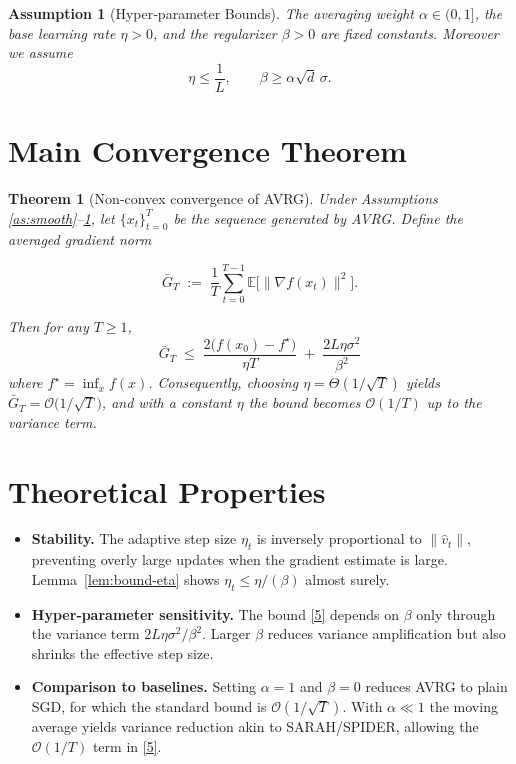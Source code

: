 \documentclass{article}
\newtheorem{theorem}{Theorem}
\newtheorem{assumption}{Assumption}
\newcommand{\E}{\mathbb{E}}
\begin{document}
\begin{assumption}[Hyper‑parameter Bounds]\label{as:params}
The averaging weight $\alpha\in(0,1]$, the base learning rate $\eta>0$,
and the regularizer $\beta>0$ are fixed constants. Moreover we assume
\[
\eta\le\frac{1}{L},\qquad \beta\ge \alpha\sqrt{d}\,\sigma .
\tag{A3}
\]
\end{assumption}

\section*{Main Convergence Theorem}
\begin{theorem}[Non‑convex convergence of AVRG]\label{thm:main}
Under Assumptions \ref{as:smooth}–\ref{as:params}, let $\{x_t\}_{t=0}^{T}$ be the
sequence generated by AVRG. Define the averaged gradient norm  

\[
\bar G_T \;:=\; \frac{1}{T}\sum_{t=0}^{T-1}\E\!\big[\|\nabla f(x_t)\|^{2}\big].
\]

Then for any $T\ge 1$,
\[
\boxed{\;
\bar G_T \;\le\;
\frac{2\big(f(x_0)-f^{\star}\big)}{\eta T}
\;+\;
\frac{2L\eta\sigma^{2}}{\beta^{2}}
\;}
\tag{5}
\]
where $f^{\star}=\inf_{x}f(x)$. Consequently, choosing $\eta =\Theta(1/\sqrt{T})$
yields $\bar G_T =\mathcal{O}\!\big(1/\sqrt{T}\big)$, and with a constant
$\eta$ the bound becomes $\mathcal{O}(1/T)$ up to the variance term.
\end{theorem}

\section*{Theoretical Properties}
\begin{itemize}
\item \textbf{Stability.} The adaptive step size $\eta_t$ is inversely proportional
to $\|\hat v_t\|$, preventing overly large updates when the gradient estimate
is large. Lemma~\ref{lem:bound-eta} shows $\eta_t\le \eta/(\beta)$ almost surely.
\item \textbf{Hyper‑parameter sensitivity.} The bound \eqref{5} depends on
$\beta$ only through the variance term $2L\eta\sigma^{2}/\beta^{2}$. Larger $\beta$
reduces variance amplification but also shrinks the effective step size.
\item \textbf{Comparison to baselines.} Setting $\alpha=1$ and $\beta=0$ reduces AVRG
to plain SGD, for which the standard bound is $\mathcal{O}(1/\sqrt{T})$.
With $\alpha\ll1$ the moving average yields variance reduction akin to SARAH/SPIDER,
allowing the $\mathcal{O}(1/T)$ term in \eqref{5}.
\end{itemize}
\end{document}
